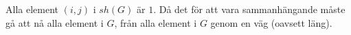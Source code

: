 Alla  element $(i,j)$ i $sh(G)$ är $1$. Då det för att vara sammanhängande måste gå att nå alla element i $G$, från alla element i $G$ genom en väg (oavsett läng).
